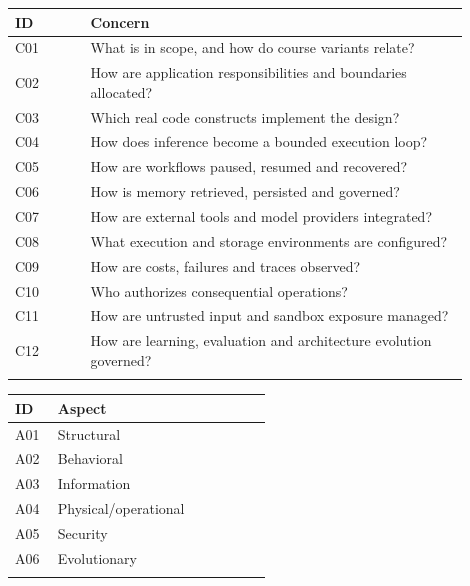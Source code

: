\documentclass[10pt,letterpaper]{article}
\begin{document}
\begin{longtable}{@{}>{\raggedright\arraybackslash}p{0.15\linewidth}>{\raggedright\arraybackslash}p{0.75\linewidth}@{}}
\toprule
ID & Concern\\\midrule\endhead
C01 & What is in scope, and how do course variants relate?\\\addlinespace
C02 & How are application responsibilities and boundaries allocated?\\\addlinespace
C03 & Which real code constructs implement the design?\\\addlinespace
C04 & How does inference become a bounded execution loop?\\\addlinespace
C05 & How are workflows paused, resumed and recovered?\\\addlinespace
C06 & How is memory retrieved, persisted and governed?\\\addlinespace
C07 & How are external tools and model providers integrated?\\\addlinespace
C08 & What execution and storage environments are configured?\\\addlinespace
C09 & How are costs, failures and traces observed?\\\addlinespace
C10 & Who authorizes consequential operations?\\\addlinespace
C11 & How are untrusted input and sandbox exposure managed?\\\addlinespace
C12 & How are learning, evaluation and architecture evolution governed?\\\addlinespace
\bottomrule\end{longtable}
\begin{longtable}{@{}>{\raggedright\arraybackslash}p{0.15\linewidth}>{\raggedright\arraybackslash}p{0.75\linewidth}@{}}
\toprule
ID & Aspect\\\midrule\endhead
A01 & Structural\\\addlinespace
A02 & Behavioral\\\addlinespace
A03 & Information\\\addlinespace
A04 & Physical/operational\\\addlinespace
A05 & Security\\\addlinespace
A06 & Evolutionary\\\addlinespace
\bottomrule\end{longtable}
\end{document}
